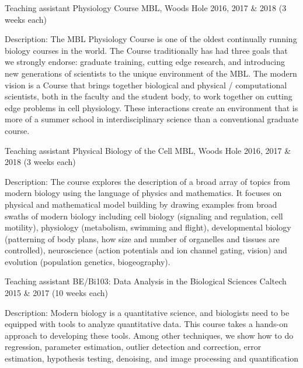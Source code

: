\begin{cventries}
  \cventry
    {Teaching assistant} %
    {Physiology Course} %
    {MBL, Woods Hole} %
    {2016, 2017 \& 2018 (3 weeks each)} %
    {
      \begin{cvitems} %
        \item {Description: The MBL Physiology Course is one of the oldest
        continually running biology courses in the world. The Course
        traditionally has had three goals that we strongly endorse: graduate
        training, cutting edge research, and introducing new generations of
        scientists to the unique environment of the MBL. The modern vision is a
        Course that brings together biological and physical / computational
        scientists, both in the faculty and the student body, to work together
        on cutting edge problems in cell physiology. These interactions create
        an environment that is more of a summer school in interdisciplinary
        science than a conventional graduate course.}
      \end{cvitems}
    }

  \cventry
    {Teaching assistant} %
    {Physical Biology of the Cell} %
    {MBL, Woods Hole} %
    {2016, 2017 \& 2018 (3 weeks each)} %
    {
      \begin{cvitems} %
        \item {Description: The course explores the description of a broad
        array of topics from modern biology using the language of physics and
        mathematics. It focuses on physical and mathematical model building by
        drawing examples from broad swaths of modern biology including cell
        biology (signaling and regulation, cell motility), physiology
        (metabolism, swimming and flight), developmental biology (patterning of
        body plans, how size and number of organelles and tissues are
        controlled), neuroscience (action potentials and ion channel gating,
        vision) and evolution (population genetics, biogeography).}
      \end{cvitems}
    }

  \cventry
    {Teaching assistant} %
    {BE/Bi103: Data Analysis in the Biological Sciences} %
    {Caltech} %
    {2015 \& 2017 (10 weeks each)} %
    {
      \begin{cvitems} %
        \item {Description: Modern biology is a quantitative science, and
        biologists need to be equipped with tools to analyze quantitative data.
        This course takes a hands-on approach to developing these tools. Among
        other techniques, we show how to do regression, parameter estimation,
        outlier detection and correction, error estimation, hypothesis testing,
        denoising, and image processing and quantification}
      \end{cvitems}
    }


\end{cventries}
